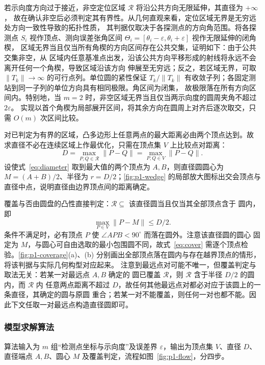 若示向度方向过于接近，非空定位区域 $\mathcal{R}$ 将沿公共方向无限延伸，其直径为 $+\infty$，
故在确认非空后必须判定其有界性。从几何直观来看，定位区域无界是无穷远处方向一致性导致的拓扑性质，
其判据仅取决于各探测点的方向角范围。将各探测点 $S_i$ 视作顶点、测向误差张角区间 
$\Theta_i = [\theta_i - \varepsilon, \theta_i + \varepsilon]$ 视作无限延伸的闭角楔，
区域无界当且仅当所有角楔的方向区间存在公共交集，证明如下：由于公共交集非空，从
区域内任意基准点出发，沿该公共方向平移形成的射线将永远不会离开任何一个角楔，导致区域沿该方向
伸展至无穷远；反之，若区域无界，可取 $\|T_k\|\to\infty$ 的可行点列。单位圆的紧性保证
$T_k/\|T_k\|$ 有收敛子列；各固定测站到同一子列的单位方向具有相同极限。角区间为闭集，
故极限落在所有方向区间内。特别地，当 $m=2$ 时，非空区域无界当且仅当两示向度的圆周夹角不超过 $2\varepsilon$。
实现以首个角楔为局部展开区间，将其余方向在圆周上对齐后逐次取交，只需 $O(m)$ 次区间比较。

对已判定为有界的区域，凸多边形上任意两点的最大距离必由两个顶点达到。故
求直径不必在连续区域上作最优化，只需在顶点集 $V$ 上比较点对距离：
\begin{equation}
D=\max_{P,Q\in\mathcal{R}}\|P-Q\|=\max_{P,Q\in V}\|P-Q\| .
\label{eq:diameter}
\end{equation}
设使式~\eqref{eq:diameter} 取到最大值的两个顶点为 $A,B$，则直径圆圆心为
$M=(A+B)/2$、半径为 $r=D/2$；\cref{fig:p1-wedge} 的局部放大图标出交会顶点与直径中点，说明直径由边界顶点间的距离确定。

覆盖与否由圆盘的凸性直接判定：$\mathcal{R}\subseteq$ 该直径圆当且仅当其全部顶点含于
圆内，即
\begin{equation}
\max_{P\in V}\|P-M\|\le D/2 .
\label{eq:cover}
\end{equation}
条件不满足时，必有顶点 $P$ 使 $\angle APB<90^\circ$ 而落在圆外。注意该直径圆的圆心
固定为 $M$，与圆心可自由选取的最小包围圆不同，故式~\eqref{eq:cover} 需逐个顶点检验。\cref{fig:p1-coverage}(a)、(b) 分别画出全部顶点落在圆内与存在越界顶点的情形，将该判据与实际几何构型对应起来。
注意到最远点对可能不唯一，但覆盖判定与取法无关：若某一对最远点 $A,B$ 确定的
圆已覆盖 $\mathcal{R}$，则 $\mathcal{R}$ 含于半径 $D/2$ 的圆内，而 $\mathcal{R}$ 内
任意两点距离不超过 $D$，故任何其他最远点对都必对应于该圆上的一条直径，其确定的圆与原圆
重合；若某一对不能覆盖，则任何一对也都不能。因此下文任取一对最远点构造直径圆即可。

\subsubsection{模型求解算法}
算法输入为 $m$ 组“检测点坐标与示向度”及误差界 $\varepsilon$，输出为顶点集 $V$、直径
$D$、直径端点 $A,B$、圆心 $M$ 及覆盖判定，流程如图~\ref{fig:p1-flow}，分四步。

